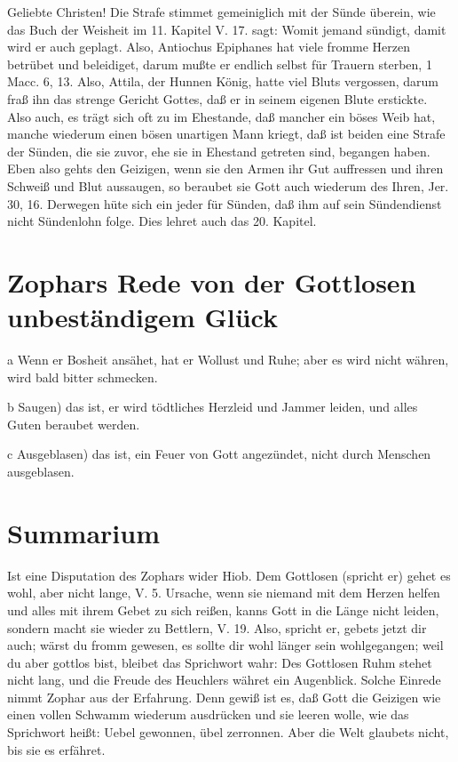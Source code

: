 Geliebte Christen! Die Strafe stimmet gemeiniglich mit der Sünde überein, wie das Buch der Weisheit im 11. Kapitel V. 17. sagt: Womit jemand sündigt, damit wird er auch geplagt. Also, Antiochus Epiphanes hat viele fromme Herzen betrübet und beleidiget, darum mußte er endlich selbst für Trauern sterben, 1 Macc. 6, 13. Also, Attila, der Hunnen König, hatte viel Bluts vergossen, darum fraß ihn das strenge Gericht Gottes, daß er in seinem eigenen Blute erstickte. Also auch, es trägt sich oft zu im Ehestande, daß mancher ein böses Weib hat, manche wiederum einen bösen unartigen Mann kriegt, daß ist beiden eine Strafe der Sünden, die sie zuvor, ehe sie in Ehestand getreten sind, begangen haben. Eben also gehts den Geizigen, wenn sie den Armen ihr Gut auffressen und ihren Schweiß und Blut aussaugen, so beraubet sie Gott auch wiederum des Ihren, Jer. 30, 16. Derwegen hüte sich ein jeder für Sünden, daß ihm auf sein Sündendienst nicht Sündenlohn folge. Dies lehret auch das 20. Kapitel.

\section{Zophars Rede von der Gottlosen unbeständigem Glück}

a Wenn er Bosheit ansähet, hat er Wollust und Ruhe; aber es wird nicht währen, wird bald bitter schmecken.

b Saugen) das ist, er wird tödtliches Herzleid und Jammer leiden, und alles Guten beraubet werden.

c Ausgeblasen) das ist, ein Feuer von Gott angezündet, nicht durch Menschen ausgeblasen.

\section{Summarium}

Ist eine Disputation des Zophars wider Hiob. Dem Gottlosen (spricht er) gehet es wohl, aber nicht lange, V. 5. Ursache, wenn sie niemand mit dem Herzen helfen und alles mit ihrem Gebet zu sich reißen, kanns Gott in die Länge nicht leiden, sondern macht sie wieder zu Bettlern, V. 19. Also, spricht er, gebets jetzt dir auch; wärst du fromm gewesen, es sollte dir wohl länger sein wohlgegangen; weil du aber gottlos bist, bleibet das Sprichwort wahr: Des Gottlosen Ruhm stehet nicht lang, und die Freude des Heuchlers währet ein Augenblick. Solche Einrede nimmt Zophar aus der Erfahrung. Denn gewiß ist es, daß Gott die Geizigen wie einen vollen Schwamm wiederum ausdrücken und sie leeren wolle, wie das Sprichwort heißt: Uebel gewonnen, übel zerronnen. Aber die Welt glaubets nicht, bis sie es erfähret.

